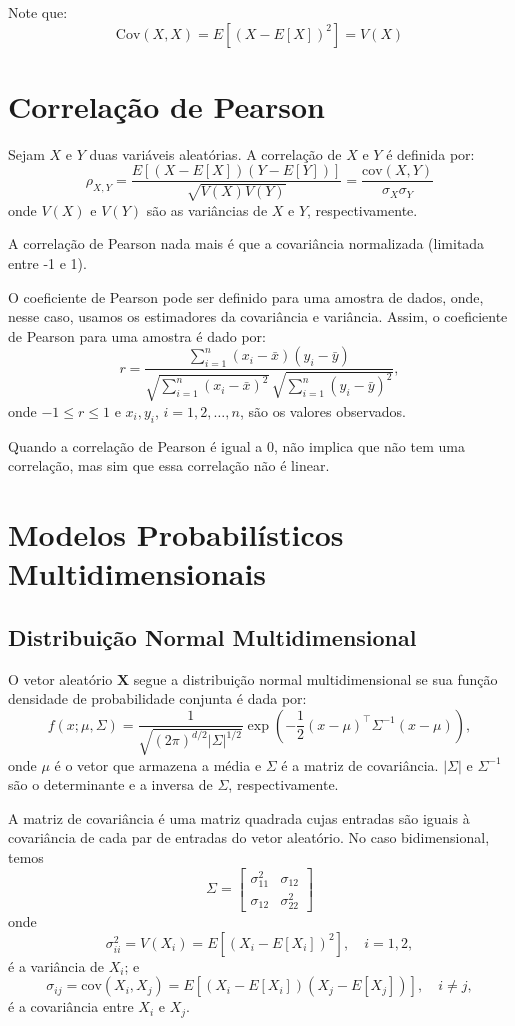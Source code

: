 \documentclass{article}
\begin{document}
Note que:
    $$
    \mathrm{Cov}(X, X) = E\left[(X - E\left[X\right])^2\right] = V(X)
    $$

\section{Correlação de Pearson}
\label{sec:correlacao_pearson}
Sejam $X$ e $Y$ duas variáveis aleatórias. A correlação de $X$ e $Y$ é definida por:
    $$
    \rho_{X,Y} =
    \frac{E[(X - E[X])(Y - E[Y])]}{\sqrt{V(X)V(Y)}} =
    \frac{\mathrm{cov}(X, Y)}{\sigma_X \sigma_Y}
    $$
onde $V(X)$ e $V(Y)$ são as variâncias de $X$ e $Y$, respectivamente.

A correlação de Pearson nada mais é que a covariância normalizada (limitada entre -1 e 1).

O coeficiente de Pearson pode ser definido para uma amostra de dados, onde, nesse caso, usamos os estimadores da covariância e variância.
Assim, o coeficiente de Pearson para uma amostra é dado por:
    $$
    r = \frac{\sum_{i=1}^{n} (x_i - \bar{x})(y_i - \bar{y})}
    {\sqrt{\sum_{i=1}^{n} (x_i - \bar{x})^2} \, \sqrt{\sum_{i=1}^{n} (y_i - \bar{y})^2}},
    $$
onde $-1 \leq r \leq 1$ e $x_i, y_i$, $i = 1, 2, \ldots, n$, são os valores observados.

Quando a correlação de Pearson é igual a 0, não implica que não tem uma correlação, mas sim que essa correlação não é linear.

\section{Modelos Probabilísticos Multidimensionais}
\subsection{Distribuição Normal Multidimensional}

O vetor aleatório $\mathbf{X}$ segue a distribuição normal multidimensional se sua função densidade de probabilidade conjunta é dada por:
    $$
    f(x; \mu, \Sigma) =
    \frac{1}{\sqrt{(2\pi)^{d/2}|\Sigma|^{1/2}}}
    \exp\left( -\frac{1}{2}(x - \mu)^\top \Sigma^{-1} (x - \mu) \right),
    $$
onde $\mu$ é o vetor que armazena a média e $\Sigma$ é a matriz de covariância.
$|\Sigma|$ e $\Sigma^{-1}$ são o determinante e a inversa de $\Sigma$, respectivamente.

A matriz de covariância é uma matriz quadrada cujas entradas são iguais à covariância de cada par de entradas do vetor aleatório.
No caso bidimensional, temos
    $$
    \Sigma =
    \begin{bmatrix}
    \sigma_{11}^2 & \sigma_{12} \\
    \sigma_{12} & \sigma_{22}^2
    \end{bmatrix}
    $$
onde
    $$
    \sigma_{ii}^2 = V(X_i) = E\left[(X_i - E[X_i])^2\right], \quad i = 1,2,
    $$
é a variância de $X_i$; e
    $$
    \sigma_{ij} = \mathrm{cov}(X_i, X_j) = E\left[(X_i - E[X_i])(X_j - E[X_j])\right], \quad i \neq j,
    $$
é a covariância entre $X_i$ e $X_j$.
\end{document}
